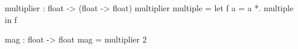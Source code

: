 \begin{minipage}{3in}
  \begin{AVerb}[gobble=4,numbers=left]
    multiplier : float -> 
      (float -> float)
    multiplier multiple = 
      let f a = a *. multiple \label{lang_fig2_ml_fun}
      in f

    mag : float -> float
    mag = multiplier 2 \label{lang_fig2_ml_mag}
  \end{AVerb}
\end{minipage}
